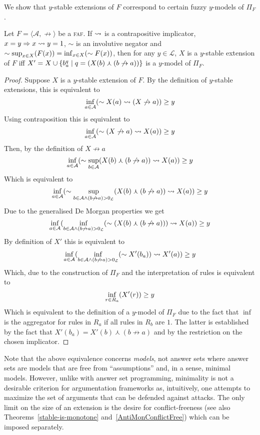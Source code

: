 \documentclass[12pt,a4paper]{article}
\newcommand{\mc}[1]{\ensuremath{\mathcal{#1}}}
\newcommand{\abfaf}{\textsc{faf}}
\newcommand{\attack}{\ensuremath{\not\rightarrow}}
\newcommand{\af}[2]{\ensuremath{\langle{#1},{#2}\rangle}}
\newcommand{\fand}{\ensuremath{\curlywedge}}
\newcommand{\fneg}{\ensuremath{\sim}}
\begin{document}
We show that
$y$-stable extensions of $F$ correspond to certain fuzzy $y$-models of $\Pi_F$.

\begin{theorem}\label{ThmFafFasp}
 Let $F=\af{\mc{A}}{\attack}$ be a \abfaf{}.
If $\rightsquigarrow$ is a contrapositive implicator,
 $x = y \Rightarrow x \rightsquigarrow y = 1$,
 $\fneg$ is an involutive negator and
 $\fneg \suprof{x \in X}{F(x)} = \infof{x \in X}{\fneg F(x)}$,
then for any $y \in \mc{L}$,
$X$ is a $y$-stable extension of $F$
iff $X' = X \cup \set{ b_a^q \mid q = (X(b) \fand (b \attack a))}$
is a $y$-model of $\Pi_F$.
\end{theorem}
\begin{proof}
Suppose $X$ is a $y$-stable extension of $F$.  By the definition of $y$-stable extensions, this is equivalent to
 $$\infof{a\in\mc{A}}{\fneg X(a) \fimp (X \attack a)} \geq y$$
Using contraposition this is equivalent to
 $$\infof{a\in\mc{A}}{\fneg(X \attack a) \fimp X(a)} \geq y$$
Then, by the definition of $X \attack a$
 $$\infof{a\in\mc{A}}{\fneg\suprof{b\in\mc{A}}{X(b) \fand (b \attack a)} \fimp X(a)} \geq y$$
Which is equivalent to
 $$\infof{a\in\mc{A}}{\fneg\suprof{b\in\mc{A} \wedge (b \attack a) > 0_\mc{L}}{X(b) \fand (b \attack a)} \fimp X(a)} \geq y$$
Due to the generalised De Morgan properties we get
 $$\infof{a\in\mc{A}}{\infof{b\in\mc{A} \wedge (b \attack a) > 0_\mc{L}}{\fneg(X(b) \fand (b \attack a))} \fimp X(a)} \geq y$$
By definition of $X'$ this is equivalent to
 $$\infof{a\in\mc{A}}{\infof{b\in\mc{A} \wedge (b \attack a) > 0_\mc{L}}{\fneg X'(b_a)} \fimp X'(a)} \geq y$$
Which, due to the construction of $\Pi_F$ and the interpretation of rules is equivalent to
 $$\inf_{r \in R_a}({X'(r)}) \geq y$$
Which is equivalent to the definition of a $y$-model of $\Pi_F$ due to the fact that $\inf$ is the aggregator for rules in $R_a$ if all rules in $R_b$ are $1$.  The latter is established by the fact that $X'(b_a) = X'(b) \fand (b \attack a)$ and by the restriction on the chosen implicator.
\end{proof}

Note that the above equivalence concerns \abfasp{} \emph{models}, not
answer sets where answer sets are models that are free from
``assumptions''\cite{fasp0} and, in a sense, minimal models. 
However, unlike with answer set programming,
minimality is not a desirable criterion for argumentation frameworks
as, intuitively, one attempts to maximize the set of arguments that can be defended
against attacks. The only limit on the size of an extension is the
desire for conflict-freeness (see also
Theorems~\ref{stable-is-monotone} and~\ref{AntiMonConflictFree})
which can be imposed separately.
\end{document}
